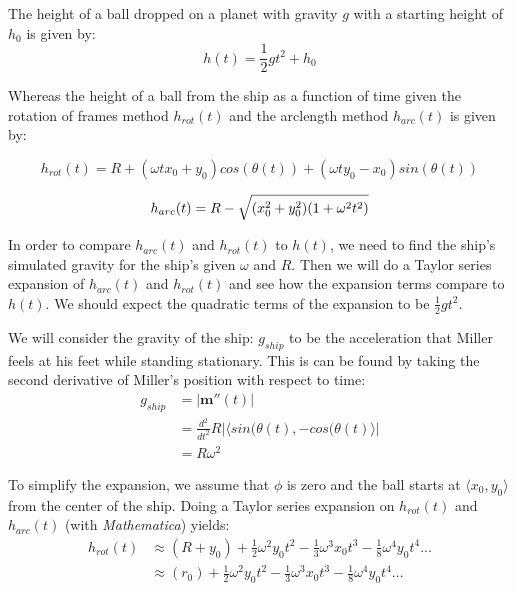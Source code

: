 \documentclass{amsart}
\renewcommand{\vec}{\textbf}
\theoremstyle{definition}
\begin{document}
The height of a ball dropped on a planet with gravity $g$ with a starting height of $h_0$ is given by:
\begin{equation}
    h(t)=\frac{1}{2}gt^2 +h_0
\end{equation}

Whereas the height of a ball from the ship as a function of time given the rotation of frames method $h_{rot}(t)$ and the arclength method $h_{arc}(t)$ is given by:

\begin{equation}
    h_{rot}(t) = R+(\omega t x_0 + y_0)cos(\theta(t))+(\omega t y_0 - x_0)sin(\theta (t))
\end{equation}

\begin{equation}
    h_{arc}(t) = R - \sqrt{(x_0^2+y_0^2)(1+\omega^2 t^2)} \\
\end{equation}

In order to compare $h_{arc}(t)$ and $h_{rot}(t)$ to $h(t)$, we need to find the ship's simulated gravity for the ship's given $\omega$ and $R$. Then we will do a Taylor series expansion of $h_{arc}(t)$ and $h_{rot}(t)$ and see how the expansion terms compare to $h(t)$. We should expect the quadratic terms of the expansion to be $\frac{1}{2}gt^2$.

We will consider the gravity of the ship: $g_{ship}$  to be the acceleration that Miller feels at his feet while standing stationary. This is can be found by taking the second derivative of Miller's position with respect to time:
\begin{equation}
\begin{split}
     g_{ship}&=\lvert\vec{m}''(t)\rvert \\
     &= \frac{d^2}{dt^2}R\lvert \langle sin(\theta(t),-cos(\theta(t)\rangle \rvert \\
     &=R \omega^2
\end{split}
\end{equation}

To simplify the expansion, we assume that  $\phi$ is zero and the ball starts at $\langle x_0,y_0\rangle$ from the center of the ship. Doing a Taylor series expansion on $h_{rot}(t)$ and $h_{arc}(t)$ (with \textsl{Mathematica}) yields:
\begin{equation}
\begin{split}
     h_{rot}(t) &\approx (R+y_0)+\frac{1}{2}\omega^2 y_0 t^2 - \frac{1}{3}\omega^3 x_0 t^3 -\frac{1}{8}\omega^4 y_0 t^4... \\
     &\approx (r_0)+\frac{1}{2}\omega^2 y_0 t^2 - \frac{1}{3}\omega^3 x_0 t^3 -\frac{1}{8}\omega^4 y_0 t^4...
\end{split}
\end{equation}
\end{document}
